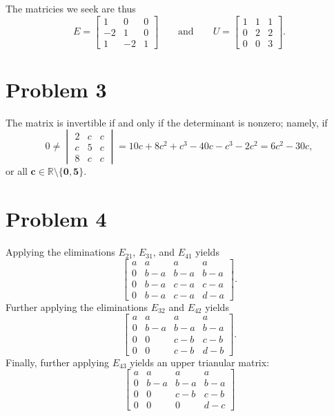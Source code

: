 \documentclass[11pt]{article}
\begin{document}
The matricies we seek are thus
\[
	E = \begin{bmatrix} 1 & 0 & 0 \\ -2 & 1 & 0 \\ 1 & -2 & 1 \end{bmatrix} \qquad \text{and} \qquad U = \begin{bmatrix} 1 & 1 & 1 \\ 0 & 2 & 2 \\ 0 & 0 & 3 \end{bmatrix}.
\]


\section{Problem 3}

The matrix is invertible if and only if the determinant is nonzero; namely, if 
\[
	0 \ne \begin{vmatrix} 2 & c & c \\ c & 5 & c \\ 8 & c & c \end{vmatrix} = 10c + 8c^{2} + c^{3} - 40c - c^{3} - 2c^{2} = 6c^{2} - 30c,
\]
or all $\mathbf{c \in \mathbb{R} \setminus \{ 0, 5 \}}$.


\section{Problem 4}

Applying the eliminations $E_{21}$, $E_{31}$, and $E_{41}$ yields
\[
	\begin{bmatrix} a & a & a & a \\ 0 & b-a & b - a & b - a \\ 0 & b - a & c - a & c - a \\ 0 & b - a & c - a & d - a \end{bmatrix}.
\]
Further applying the eliminations $E_{32}$ and $E_{42}$ yields
\[
	\begin{bmatrix} a & a & a & a \\ 0 & b - a & b - a & b - a \\ 0 & 0 & c - b & c - b \\ 0 & 0 & c - b & d - b \end{bmatrix}.
\]
Finally, further applying $E_{43}$ yields an upper trianular matrix:
\[
	\begin{bmatrix} a & a & a & a \\ 0 & b-a & b-a & b-a \\ 0 & 0 & c-b & c-b \\ 0 & 0 & 0 & d-c \end{bmatrix}
\]
\end{document}
